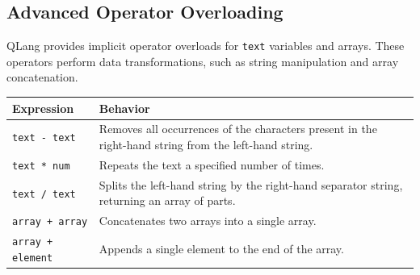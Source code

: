 

\subsection{Advanced Operator Overloading}\label{sec:adv-operator-overloading}

QLang provides implicit operator overloads for \texttt{text} variables and arrays. These operators perform data transformations, such as string manipulation and array concatenation.

\begin{center}
\begin{tabular}{|p{3cm}|p{9cm}|}
\hline
\textbf{Expression} & \textbf{Behavior} \\
\hline
\texttt{text - text} & 
    Removes all occurrences of the characters present in the right-hand string from the left-hand string. \\
\hline
\texttt{text * num} & 
    Repeats the text a specified number of times. \\
\hline
\texttt{text / text} & 
    Splits the left-hand string by the right-hand separator string, returning an array of parts. \\
\hline
\texttt{array + array} & 
    Concatenates two arrays into a single array. \\
\hline
\texttt{array + element} & 
    Appends a single element to the end of the array. \\
\hline
\end{tabular}
\end{center}


